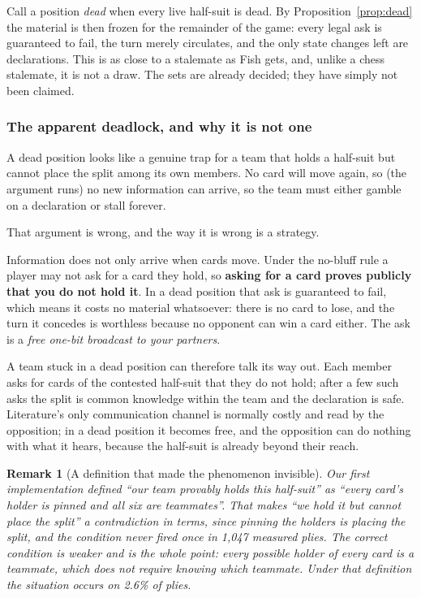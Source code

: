 \documentclass[11pt,letterpaper]{article}
\newtheorem{remark}{Remark}
\begin{document}
Call a position \emph{dead} when every live half-suit is dead. By
Proposition~\ref{prop:dead} the material is then frozen for the remainder of the
game: every legal ask is guaranteed to fail, the turn merely circulates, and the
only state changes left are declarations. This is as close to a stalemate as
Fish gets, and, unlike a chess stalemate, it is not a draw. The sets are
already decided; they have simply not been claimed.

\subsubsection{The apparent deadlock, and why it is not one}

A dead position looks like a genuine trap for a team that holds a half-suit but
cannot place the split among its own members. No card will move again, so
(the argument runs) no new information can arrive, so the team must either
gamble on a declaration or stall forever.

That argument is wrong, and the way it is wrong is a strategy.

Information does not only arrive when cards move. Under the no-bluff rule a
player may not ask for a card they hold, so \textbf{asking for a card proves
publicly that you do not hold it}. In a dead position that ask is guaranteed to
fail, which means it costs no material whatsoever: there is no card to lose, and
the turn it concedes is worthless because no opponent can win a card either. The
ask is a \emph{free one-bit broadcast to your partners}.

A team stuck in a dead position can therefore talk its way out. Each member asks
for cards of the contested half-suit that they do not hold; after a few such
asks the split is common knowledge within the team and the declaration is safe.
Literature's only communication channel is normally costly and read by the
opposition; in a dead position it becomes free, and the opposition can do
nothing with what it hears, because the half-suit is already beyond their reach.

\begin{remark}[A definition that made the phenomenon invisible]
Our first implementation defined ``our team provably holds this half-suit'' as
``every card's holder is pinned and all six are teammates''. That makes ``we hold
it but cannot place the split'' a contradiction in terms, since pinning the
holders \emph{is} placing the split, and the condition never fired once in 1,047
measured plies. The correct condition is weaker and is the whole point: every
\emph{possible} holder of every card is a teammate, which does not require
knowing which teammate. Under that definition the situation occurs on 2.6\% of
plies.
\end{remark}
\end{document}
